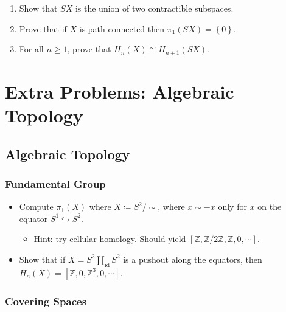 \begin{enumerate}
\def\labelenumi{\alph{enumi}.}
\item
  Show that \(SX\) is the union of two contractible subspaces.
\item
  Prove that if \(X\) is path-connected then
  \(\pi_1 (SX) = \left\{{0}\right\}\).
\item
  For all \(n \geq 1\), prove that \(H_{n} (X) \cong H_{n+1} (SX)\).
\end{enumerate}

\hypertarget{extra-problems-algebraic-topology}{%
\section{Extra Problems: Algebraic
Topology}\label{extra-problems-algebraic-topology}}

\hypertarget{algebraic-topology}{%
\subsection{Algebraic Topology}\label{algebraic-topology}}

\hypertarget{fundamental-group}{%
\subsubsection{Fundamental Group}\label{fundamental-group}}

\begin{itemize}
\tightlist
\item
  Compute \(\pi_1(X)\) where \(X \coloneqq S^2/\sim\), where
  \(x\sim -x\) only for \(x\) on the equator
  \(S^1 \hookrightarrow S^2\).

  \begin{itemize}
  \tightlist
  \item
    Hint: try cellular homology. Should yield
    \([{\mathbb{Z}}, {\mathbb{Z}}/2{\mathbb{Z}}, {\mathbb{Z}}, 0, \cdots]\).
  \end{itemize}
\item
  Show that if \(X = S^2 {\textstyle\coprod}_{\operatorname{id}} S^2\)
  is a pushout along the equators, then
  \(H_n(X) = [{\mathbb{Z}}, 0, {\mathbb{Z}}^3, 0, \cdots]\).
\end{itemize}

\hypertarget{covering-spaces-1}{%
\subsubsection{Covering Spaces}\label{covering-spaces-1}}

